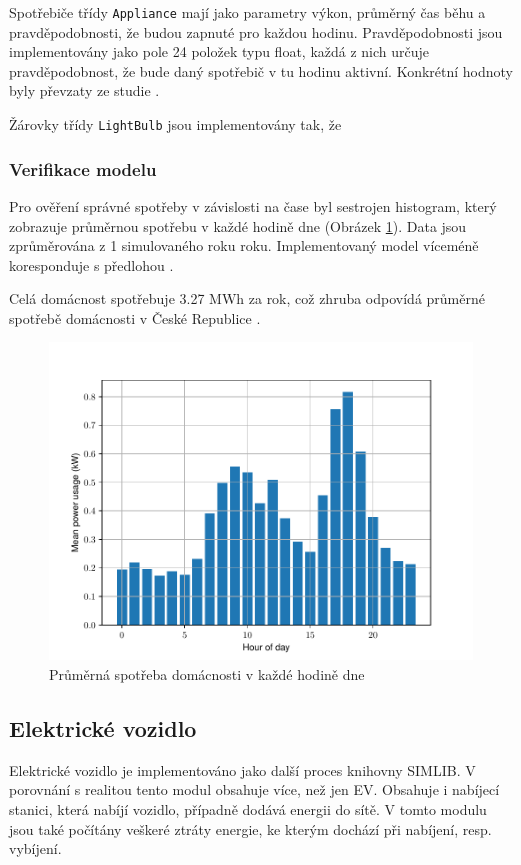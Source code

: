 \documentclass[12pt,a4paper]{Cotmas-2018}
\begin{document}
Spotřebiče třídy \texttt{Appliance} mají jako parametry výkon, průměrný čas běhu a pravděpodobnosti, že budou zapnuté pro každou hodinu.
Pravděpodobnosti jsou implementovány jako pole 24 položek typu float,
každá z nich určuje pravděpodobnost, že bude daný spotřebič v tu hodinu aktivní.
Konkrétní hodnoty byly převzaty ze studie \cite{Torriti-2017}.

Žárovky třídy \texttt{LightBulb} jsou implementovány tak,
že

\subsubsection{Verifikace modelu}

Pro ověření správné spotřeby v závislosti na čase byl sestrojen histogram,
který zobrazuje průměrnou spotřebu v každé hodině dne (Obrázek \ref{fig:average_day_load}).
Data jsou zprůměrována z 1 simulovaného roku roku.
Implementovaný model víceméně koresponduje s předlohou \cite{Torriti-2017}.

Celá domácnost spotřebuje 3.27 MWh za rok, což zhruba odpovídá průměrné spotřebě domácnosti v České Republice \cite{CEZ}.

\begin{figure}
\includegraphics[width=\linewidth]{img/average_day_load.pdf}
\caption{Průměrná spotřeba domácnosti v každé hodině dne}
\label{fig:average_day_load}
\end{figure}

\subsection{Elektrické vozidlo}
Elektrické vozidlo je implementováno jako další proces knihovny SIMLIB.
V porovnání s realitou tento modul obsahuje více, než jen EV.
Obsahuje i nabíjecí stanici, která nabíjí vozidlo, případně dodává energii do sítě.
V tomto modulu jsou také počítány veškeré ztráty energie, ke kterým dochází při nabíjení, resp. vybíjení.
\end{document}

